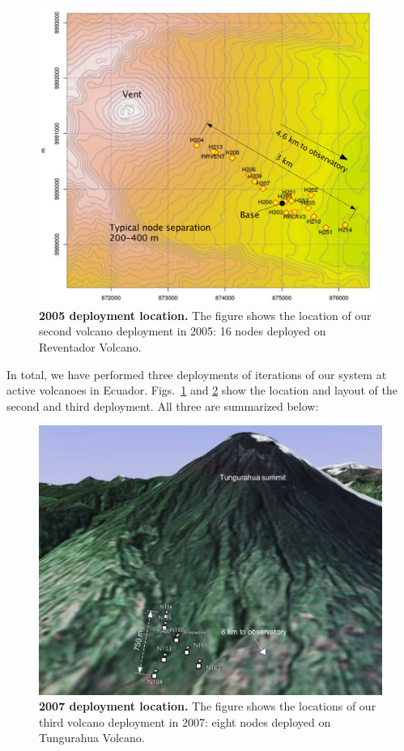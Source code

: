 \begin{figure}[t]
\begin{center}
\includegraphics[width=0.8\hsize]{./1-introduction/figs/2005-deployment-map.pdf}
\end{center}
\caption{\textbf{2005 deployment location.} The figure shows the location of
our second volcano deployment in 2005: 16 nodes deployed on Reventador
Volcano.}
\label{introduction-fig-deployment-map-2005}
\end{figure}

In total, we have performed three deployments of iterations of our system at
active volcanoes in Ecuador. Figs.~\ref{introduction-fig-deployment-map-2005}
and \ref{introduction-fig-deployment-map-2007} show the location and layout
of the second and third deployment. All three are summarized below:

\begin{figure}[t]
\begin{center}
\includegraphics[width=0.8\hsize]{./1-introduction/figs/2007-deployment-map.pdf}
\end{center}
\caption{\textbf{2007 deployment location.} The figure shows the locations of
our third volcano deployment in 2007: eight nodes deployed on Tungurahua
Volcano.}
\label{introduction-fig-deployment-map-2007}
\end{figure}

